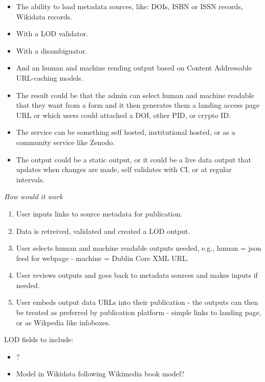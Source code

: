 \documentclass{article}
\begin{document}
\begin{itemize}
\item The ability to load metadata sources, like: DOIs, ISBN or ISSN records, Wikidata records.


\item With a LOD validator.


\item With a disambiguator.


\item And an human and machine rending output based on Content Addressable URL-caching models.


\item The result could be that the admin can select human and machine readable that they want from a form and it then generates them a landing access page URL or which users could attached a DOI, other PID, or crypto ID.


\item The service can be something self hosted, institutional hosted, or as a community service like Zenodo.


\item The output could be a static output, or it could be a live data output that updates when changes are made, self validates with CI, or at regular intervals.


\end{itemize}

\emph{How would it work}

\begin{enumerate}
\item User inputs links to source metadata for publication.


\item Data is retreived, validated and created a LOD output.


\item User selects human and machine readable outputs needed, e.g., human = json feed for webpage - machine = Dublin Core XML URL.


\item User reviews outputs and goes back to metadata sources and makes inputs if needed.


\item User embeds output data URLs into their publication - the outputs can then be treated as preferred by publication platform - simple links to landing page, or as Wikpedia like infoboxes.


\end{enumerate}

LOD fields to include:

\begin{itemize}
\item ?


\item Model in Wikidata following Wikimedia book model?


\end{itemize}
\end{document}
